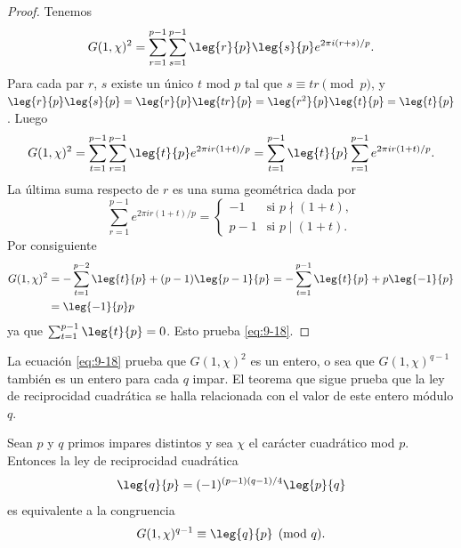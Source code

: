\documentclass[12pt,a4paper]{book}
\begin{document}
    \begin{proof}
        Tenemos
        \begin{equation*}
            G(1,\chi)^{2}=\sum_{r=1}^{p-1}\sum_{s=1}^{p-1}\leg{r}{p}\leg{s}{p}e^{2\pi i(r+s)/p}.
        \end{equation*}
        Para cada par $r$, $s$ existe un único $t$ mod $p$ tal que $s\equiv tr\pmod{p}$, y
        $\leg{r}{p}\leg{s}{p}=\leg{r}{p}\leg{tr}{p}=\leg{r^{2}}{p}\leg{t}{p}=\leg{t}{p}$.
        Luego
        \begin{equation*}
            G(1,\chi)^{2}=\sum_{t=1}^{p-1}\sum_{r=1}^{p-1}\leg{t}{p}e^{2\pi ir(1+t)/p}
            =\sum_{t=1}^{p-1}\leg{t}{p}\sum_{r=1}^{p-1}e^{2\pi ir(1+t)/p}.
        \end{equation*}
        La última suma respecto de $r$ es una suma geométrica dada por
        \begin{equation*}
            \sum_{r=1}^{p-1}e^{2\pi ir(1+t)/p}=
            \begin{cases}
                -1&\text{si }p\nmid(1+t),\\
                p-1&\text{si }p\mid(1+t).
            \end{cases}
        \end{equation*}
        Por consiguiente
        \begin{align*}
            G(1,\chi)^{2}&=-\sum_{t=1}^{p-2}\leg{t}{p}+(p-1)\leg{p-1}{p}
            =-\sum_{t=1}^{p-1}\leg{t}{p}+p\leg{-1}{p}\\
            &=\leg{-1}{p}p
        \end{align*}
        ya que $\sum_{t=1}^{p-1}\leg{t}{p}=0$. Esto prueba \eqref{eq:9-18}.
    \end{proof}

    La ecuación \eqref{eq:9-18} prueba que $G(1,\chi)^{2}$ es un entero, o sea que
    $G(1,\chi)^{q-1}$ también es un entero para cada $q$ impar. El teorema que sigue prueba
    que la ley de reciprocidad cuadrática se halla relacionada con el valor de este entero
    módulo $q$.

    \begin{teorema}\label{teo:9-14}
        Sean $p$ y $q$ primos impares distintos y sea $\chi$ el carácter cuadrático mod
        $p$. Entonces la ley de reciprocidad cuadrática
        \begin{equation}\label{eq:9-19}
            \leg{q}{p}=(-1)^{(p-1)(q-1)/4}\leg{p}{q}
        \end{equation}
        es equivalente a la congruencia
        \begin{equation}\label{eq:9-20}
            G(1,\chi)^{q-1}\equiv\leg{q}{p}\pmod{q}.
        \end{equation}
    \end{teorema}
\end{document}
